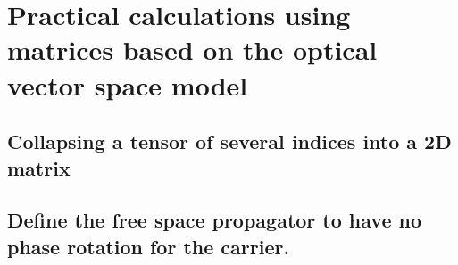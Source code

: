 \chapter{Practical calculations using matrices based on the optical vector space model}

\section{Collapsing a tensor of several indices into a 2D matrix}

\section{Define the free space propagator to have no phase rotation for the  carrier.}

